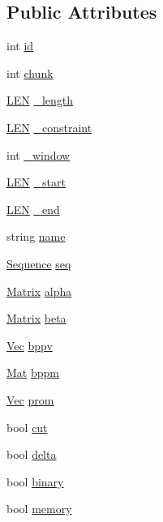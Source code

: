 \subsection*{Public Attributes}
\begin{DoxyCompactItemize}
\item 
int \hyperlink{class_rfold_1_1_paraso_r_a707ccdcc12115fbe06a923fb21e58c06}{id}
\item 
int \hyperlink{class_rfold_1_1_paraso_r_aafdf04b7ad506cfa1457bfefa3423e31}{chunk}
\item 
\hyperlink{energy__const_8hh_a05b49c662c073f89e86804f7856622a0}{L\+E\+N} \hyperlink{class_rfold_1_1_paraso_r_afcca775aebec2ac5d0f659ddb4f625c3}{\+\_\+length}
\item 
\hyperlink{energy__const_8hh_a05b49c662c073f89e86804f7856622a0}{L\+E\+N} \hyperlink{class_rfold_1_1_paraso_r_a6f7fd482b56035331f51d5e5f8c28930}{\+\_\+constraint}
\item 
int \hyperlink{class_rfold_1_1_paraso_r_a6b2fc60e2c500a03bf48d442cb11002c}{\+\_\+window}
\item 
\hyperlink{energy__const_8hh_a05b49c662c073f89e86804f7856622a0}{L\+E\+N} \hyperlink{class_rfold_1_1_paraso_r_a213a200c99cd89cf6a41715b9d1b4b05}{\+\_\+start}
\item 
\hyperlink{energy__const_8hh_a05b49c662c073f89e86804f7856622a0}{L\+E\+N} \hyperlink{class_rfold_1_1_paraso_r_aa0a39f36fc4917382d6e95174150791f}{\+\_\+end}
\item 
string \hyperlink{class_rfold_1_1_paraso_r_a52b17c1475bc8319251b6fbde1a5a6d9}{name}
\item 
\hyperlink{class_rfold_1_1_parameter_1_1_sequence}{Sequence} \hyperlink{class_rfold_1_1_paraso_r_a5f61516d848cce0e2a93b2d3e22f63ea}{seq}
\item 
\hyperlink{class_rfold_1_1_matrix}{Matrix} \hyperlink{class_rfold_1_1_paraso_r_a9f5a209eb1cd9de0f4f01c23f4f5e111}{alpha}
\item 
\hyperlink{class_rfold_1_1_matrix}{Matrix} \hyperlink{class_rfold_1_1_paraso_r_a4ebc3071b4f1aa34c75af71d88cf7382}{beta}
\item 
\hyperlink{namespace_rfold_aaf02f2c0c40c1dd572dbdd8bc1bde67d}{Vec} \hyperlink{class_rfold_1_1_paraso_r_a34ad7bc233e6711a93c7cb69c8ed9855}{bppv}
\item 
\hyperlink{namespace_rfold_a6392dbfbc164230455fdcdb1a0ff53d7}{Mat} \hyperlink{class_rfold_1_1_paraso_r_a0372b87e995aa99226a2e5c0bda44800}{bppm}
\item 
\hyperlink{namespace_rfold_aaf02f2c0c40c1dd572dbdd8bc1bde67d}{Vec} \hyperlink{class_rfold_1_1_paraso_r_ad4b227950cd3ec1df3581d9c474777e5}{prom}
\item 
bool \hyperlink{class_rfold_1_1_paraso_r_afd1dd1d5fccc77e48fa36bb090be6735}{cut}
\item 
bool \hyperlink{class_rfold_1_1_paraso_r_ac0a808250ee05c1f56b5be32d867f11e}{delta}
\item 
bool \hyperlink{class_rfold_1_1_paraso_r_af2bb3eef2ea5d6f92d490f2a36c8ab64}{binary}
\item 
bool \hyperlink{class_rfold_1_1_paraso_r_aac983ca08d7d6efbca76b6575ee839e2}{memory}
\end{DoxyCompactItemize}

